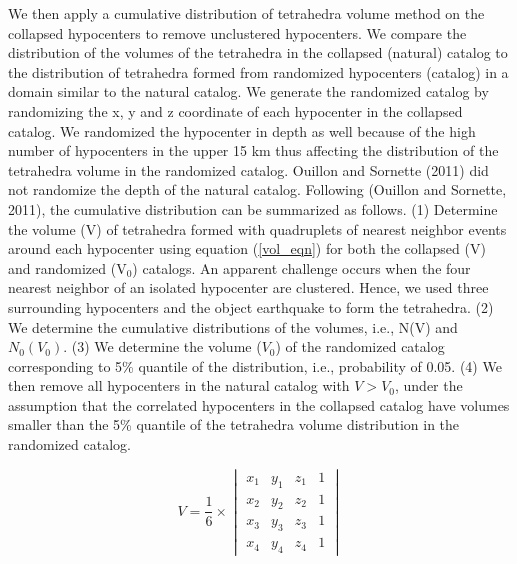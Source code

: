 \documentclass[draft]{agujournal2018}
\begin{document}
We then apply a cumulative distribution of tetrahedra volume method on the collapsed hypocenters to remove unclustered hypocenters. We compare the distribution of the volumes of the tetrahedra in the collapsed (natural) catalog to the distribution of tetrahedra formed from randomized hypocenters (catalog) in a domain similar to the natural catalog. We generate the randomized catalog by randomizing the x, y and z coordinate of each hypocenter in the collapsed catalog. We randomized the hypocenter in depth as well because of the high number of hypocenters in the upper 15 km thus affecting the distribution of the tetrahedra volume in the randomized catalog. Ouillon and Sornette (2011) did not randomize the depth of the natural catalog.  
Following (Ouillon and Sornette, 2011), the cumulative distribution can be summarized as follows. (1) Determine the volume (V) of tetrahedra formed with quadruplets of nearest neighbor events around each hypocenter using equation (\ref{vol_eqn}) for both the collapsed (V) and randomized (V$_0$) catalogs. An apparent challenge occurs when the four nearest neighbor of an isolated hypocenter are clustered. Hence, we used three surrounding hypocenters and the object earthquake to form the tetrahedra. (2) We determine the cumulative distributions of the volumes, i.e., N(V) and $N_0(V_0)$. (3) We determine the volume ($V_0$) of the randomized catalog corresponding to 5\% quantile of the distribution, i.e., probability of 0.05. (4) We then remove all hypocenters in the natural catalog with $V > V_0$, under the assumption that the correlated hypocenters in the collapsed catalog have volumes smaller than the 5\% quantile of the tetrahedra volume distribution in the randomized catalog. %

\begin{equation}\label{vol_eqn}
V = \frac{1}{6} \times 
\begin{vmatrix} 
x_{1} &  y_{1} & z_{1} & 1\\ 
x_{2} &  y_{2} & z_{2} & 1\\ 
x_{3} &  y_{3} & z_{3} & 1\\
x_{4} &  y_{4} & z_{4} & 1
\end{vmatrix} 
\end{equation}
\end{document}
